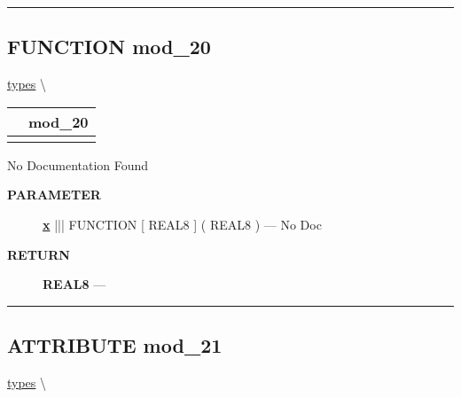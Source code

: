 \rule{\linewidth}{0.5pt}
\subsection*{\textsf{\colorbox{headtoc}{\color{white} FUNCTION}
mod\_20}}

\hypertarget{ecldoc:types.mod_20}{}
\hspace{0pt} \hyperlink{ecldoc:types}{types} \textbackslash 

{\renewcommand{\arraystretch}{1.5}
\begin{tabularx}{\textwidth}{|>{\raggedright\arraybackslash}l|X|}
\hline
\hspace{0pt}\mytexttt{\color{red} } & \textbf{mod\_20} \\
\hline
\multicolumn{2}{|>{\raggedright\arraybackslash}X|}{\hspace{0pt}\mytexttt{\color{param} (mod\_19 x)}} \\
\hline
\end{tabularx}
}

\par





No Documentation Found






\par
\begin{description}
\item [\colorbox{tagtype}{\color{white} \textbf{\textsf{PARAMETER}}}] \textbf{\underline{x}} ||| FUNCTION [ REAL8 ] ( REAL8 ) --- No Doc
\end{description}







\par
\begin{description}
\item [\colorbox{tagtype}{\color{white} \textbf{\textsf{RETURN}}}] \textbf{REAL8} --- 
\end{description}




\rule{\linewidth}{0.5pt}
\subsection*{\textsf{\colorbox{headtoc}{\color{white} ATTRIBUTE}
mod\_21}}

\hypertarget{ecldoc:types.mod_21}{}
\hspace{0pt} \hyperlink{ecldoc:types}{types} \textbackslash 

